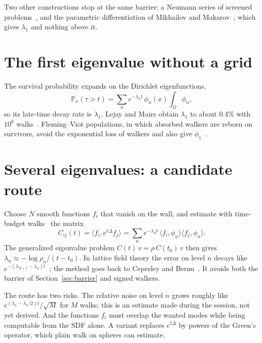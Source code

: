 \documentclass{article}
\begin{document}
Two other constructions stop at the same barrier: a Neumann series of screened problems~\cite{bernal2023}, and the parametric differentiation of Mikhailov and Makarov~\cite{mikhailov1998}, which gives $\lambda_1$ and nothing above it.

\section{The first eigenvalue without a grid}
The survival probability expands on the Dirichlet eigenfunctions,
\begin{equation}
\mathbb P_x(\tau>t)=\sum_n e^{-\lambda_n t}\,\phi_n(x)\int_\Omega\phi_n ,
\end{equation}
so its late-time decay rate is $\lambda_1$. Lejay and Maire obtain $\lambda_1$ to about 0.4\% with $10^6$ walks~\cite{lejay2007}. Fleming--Viot populations, in which absorbed walkers are reborn on survivors, avoid the exponential loss of walkers and also give $\phi_1$~\cite{burdzy1996,villemonais2011}.

\section{Several eigenvalues: a candidate route}
\label{sec:route}
Choose $N$ smooth functions $f_i$ that vanish on the wall, and estimate with time-budget walks~\cite{zhou2026} the matrix
\begin{equation}
C_{ij}(t)=\langle f_i,e^{t\Delta}f_j\rangle=\sum_n e^{-\lambda_n t}\,\langle f_i,\phi_n\rangle\langle f_j,\phi_n\rangle .
\label{eq:corr}
\end{equation}
The generalized eigenvalue problem $C(t)\,v=\rho\,C(t_0)\,v$ then gives $\lambda_n\approx-\log\rho_n/(t-t_0)$. In lattice field theory the error on level $n$ decays like $e^{-(\lambda_{N+1}-\lambda_n)t}$~\cite{blossier2009}; the method goes back to Ceperley and Bernu~\cite{ceperley1988}. It avoids both the barrier of Section~\ref{sec:barrier} and signed walkers.

The route has two risks. The relative noise on level $n$ grows roughly like $e^{(\lambda_n-\lambda_1/2)t}/\sqrt M$ for $M$ walks; this is an estimate made during the session, not yet derived. And the functions $f_i$ must overlap the wanted modes while being computable from the SDF alone. A variant replaces $e^{t\Delta}$ by powers of the Green's operator, which plain walk on spheres can estimate.
\end{document}
